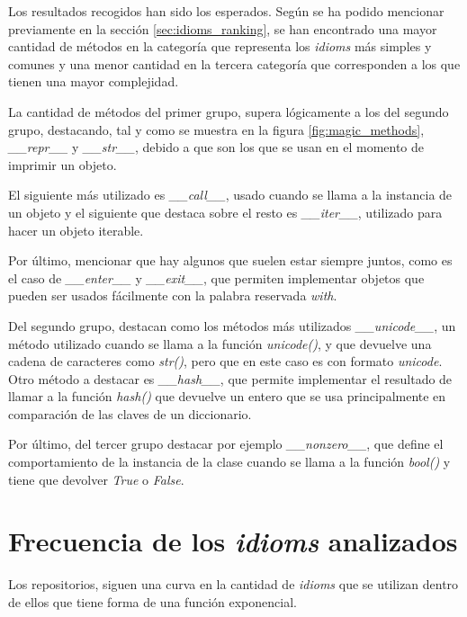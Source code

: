 \documentclass[a4paper, 12pt]{book}
\begin{document}
Los resultados recogidos han sido los esperados. Según se ha podido mencionar previamente en la sección \ref{sec:idioms_ranking}, se han encontrado una mayor cantidad de métodos en la categoría que representa los \textit{idioms} más simples y comunes y una menor cantidad en la tercera categoría que corresponden a los que tienen una mayor complejidad.

La cantidad de métodos del primer grupo, supera lógicamente a los del segundo grupo, destacando, tal y como se muestra en la figura \ref{fig:magic_methods}, \textit{\_\_repr\_\_} y \textit{\_\_str\_\_}, debido a que son los que se usan en el momento de imprimir un objeto.

El siguiente más utilizado es \textit{\_\_call\_\_}, usado cuando se llama a la instancia de un objeto y el siguiente que destaca sobre el resto es \textit{\_\_iter\_\_}, utilizado para hacer un objeto iterable.

Por último, mencionar que hay algunos que suelen estar siempre juntos, como es el caso de \textit{\_\_enter\_\_} y \textit{\_\_exit\_\_}, que permiten implementar objetos que pueden ser usados fácilmente con la palabra reservada \textit{with}.

Del segundo grupo, destacan como los métodos más utilizados \textit{\_\_unicode\_\_}, un método utilizado cuando se llama a la función \textit{unicode()}, y que devuelve una cadena de caracteres como \textit{str()}, pero que en este caso es con formato \textit{unicode}. Otro método a destacar es \textit{\_\_hash\_\_}, que permite implementar el resultado de llamar a la función \textit{hash()} que devuelve un entero que se usa principalmente en comparación de las claves de un diccionario.

Por último, del tercer grupo destacar por ejemplo \textit{\_\_nonzero\_\_}, que define el comportamiento de la instancia de la clase cuando se llama a la función \textit{bool()} y tiene que devolver \textit{True} o \textit{False}.




\section{Frecuencia de los \textit{idioms} analizados}
Los repositorios, siguen una curva en la cantidad de \textit{idioms} que se utilizan dentro de ellos que tiene forma de una función exponencial.
\end{document}
